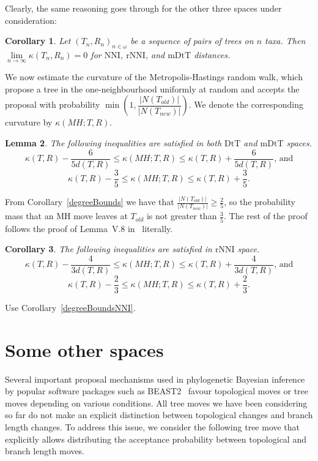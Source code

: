 \documentclass{amsart}
\newtheorem{lemma}{Lemma}
\newtheorem{corollary}[lemma]{Corollary}
\newcommand{\dts}{\mathrm{DtT}}
\newcommand{\nni}{\mathrm{NNI}}
\newcommand{\rnni}{\mathrm{rNNI}}
\newcommand{\mdts}{\mathrm{mDtT}}
\begin{document}
Clearly, the same reasoning goes through for the other three spaces under consideration:

\begin{corollary}
Let $(T_n,R_n)_{n\in\omega}$ be a sequence of pairs of trees on $n$ taxa.
Then $\lim\limits_{n \to \infty}\kappa(T_n,R_n) = 0$ for $\nni$, $\rnni$, and $\mdts$ distances.
\end{corollary}

We now estimate the curvature of the Metropolis-Hastings random walk, which
propose a tree in the one-neighbourhood uniformly at random and
accepts the proposal with probability
$\min(1, \dfrac{|N(T_{old})|}{|N(T_{new})|})$. We denote the corresponding
curvature by $\kappa(MH;T,R)$.

\begin{lemma}
The following inequalities are satisfied in both $\dts$ and $\mdts$ spaces.
\[
\kappa(T,R) - \dfrac{6}{5d(T,R)} \leq \kappa(MH;T,R) \leq \kappa(T,R) +
\dfrac{6}{5d(T,R)}\mbox{, and}
\]
\[
\kappa(T,R) - \dfrac35 \leq \kappa(MH;T,R) \leq \kappa(T,R) + \dfrac35.
\]
\end{lemma}

\proof
From Corollary~\ref{degreeBounds} we have that
$\frac{|N(T_{old})|}{|N(T_{new})|} \geq \frac{2}{5}$, so the probability
mass that an MH move leaves at $T_{old}$ is not greater than $\frac35$.
The rest of the
proof follows the proof of Lemma~V.8 in~\cite{Whidden2015-es} literally.
\endproof

\begin{corollary}
The following inequalities are satisfied in $\rnni$  space.
\[
\kappa(T,R) - \dfrac{4}{3d(T,R)} \leq \kappa(MH;T,R) \leq \kappa(T,R) +
\dfrac{4}{3d(T,R)}\mbox{, and}
\]
\[
\kappa(T,R) - \dfrac23 \leq \kappa(MH;T,R) \leq \kappa(T,R) + \dfrac23.
\]
\end{corollary}

\proof
Use Corollary~\ref{degreeBoundsNNI}.
\endproof

\section{Some other spaces}

Several important proposal mechanisms used in phylogenetic Bayesian inference by
popular software packages such as BEAST2~\cite{beast2} favour topological moves
or tree moves depending on various conditions. All tree moves we have been
considering so far do not make an explicit distinction between topological
changes and branch length changes. To address this issue, we
consider the
following tree move that explicitly allows distributing the acceptance
probability between topological and branch length moves.
\end{document}
